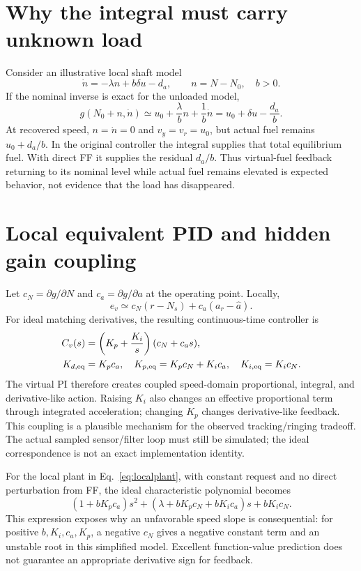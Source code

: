 \section{Why the integral must carry unknown load}
Consider an illustrative local shaft model
\begin{equation}
\dot n=-\lambda n+b\delta u-d_a,\qquad n=N-N_0,\quad b>0.
\label{eq:localplant}
\end{equation}
If the nominal inverse is exact for the unloaded model,
\begin{equation}
g(N_0+n,\dot n)\simeq u_0+\frac{\lambda}{b}n+\frac1b\dot n
=u_0+\delta u-\frac{d_a}{b}.
\end{equation}
At recovered speed, $n=\dot n=0$ and $v_y=v_r=u_0$, but actual fuel remains $u_0+d_a/b$. In the original controller the integral supplies that total equilibrium fuel. With direct FF it supplies the residual $d_a/b$. Thus virtual-fuel feedback returning to its nominal level while actual fuel remains elevated is expected behavior, not evidence that the load has disappeared.

\section{Local equivalent PID and hidden gain coupling}
Let $c_N=\partial g/\partial N$ and $c_a=\partial g/\partial a$ at the operating point. Locally,
\begin{equation}
e_v\simeq c_N(r-N_s)+c_a(a_r-\hat a).
\end{equation}
For ideal matching derivatives, the resulting continuous-time controller is
\begin{align}
C_v(s)&=\left(K_p+\frac{K_i}{s}\right)(c_N+c_as),\\
K_{d,\rm eq}&=K_pc_a,\quad
K_{p,\rm eq}=K_pc_N+K_ic_a,\quad
K_{i,\rm eq}=K_ic_N.
\label{eq:equivalent}
\end{align}
The virtual PI therefore creates coupled speed-domain proportional, integral, and derivative-like action. Raising $K_i$ also changes an effective proportional term through integrated acceleration; changing $K_p$ changes derivative-like feedback. This coupling is a plausible mechanism for the observed tracking/ringing tradeoff. The actual sampled sensor/filter loop must still be simulated; the ideal correspondence is not an exact implementation identity.

For the local plant in Eq.~\eqref{eq:localplant}, with constant request and no direct perturbation from FF, the ideal characteristic polynomial becomes
\begin{equation}
(1+bK_pc_a)s^2+(\lambda+bK_pc_N+bK_ic_a)s+bK_ic_N.
\label{eq:char}
\end{equation}
This expression exposes why an unfavorable speed slope is consequential: for positive $b,K_i,c_a,K_p$, a negative $c_N$ gives a negative constant term and an unstable root in this simplified model. Excellent function-value prediction does not guarantee an appropriate derivative sign for feedback.

